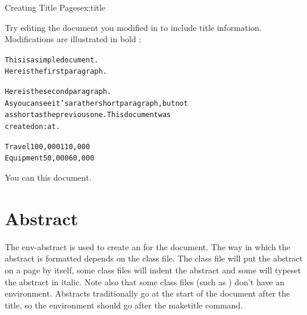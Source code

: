\begin{exercise}{Creating Title Pages}{ex:title}

Try editing the document you modified in  to
include title information.  Modifications are illustrated in bold
:

\begin{bcode}
\begin{alltt}
\oarg{12pt}





This is a simple document.
Here is the first paragraph.

Here is the second paragraph.
As you can see it's a rather short paragraph, but not
as short as the previous one. This document was
created on: at .

  
    
 Travel  100,000  110,000
 Equipment  50,000  60,000

\end{alltt}
\end{bcode}

You can  this document.
\end{exercise}


\section{Abstract}
\label{sec:abstract}

The \gls{env-abstract}  is used to
create an  for the document.  The way in which the
abstract is formatted depends on the class file\indexCLS.  The
 class file will put the abstract on a page by itself,
some class files will indent the abstract and some will typeset the
abstract in italic.  Note also that some class files (such as
) don't have an 
environment.  Abstracts traditionally go at the start of the document
after the title, so the  environment should go
after the \gls{maketitle} command.

